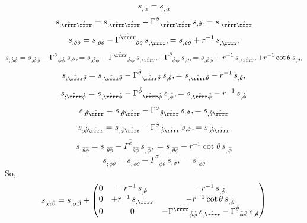 \documentclass[\mydriver,12pt,twoside,notitlepage,a4paper]{article}
\begin{document}
\begin{equation}
s_{;\hat\alpha}=s_{,\hat\alpha}
\end{equation}
\begin{equation}
s_{;\hat\rrrr\hat\rrrr}
=s_{,\hat\rrrr\hat\rrrr}
-{\Gamma^{\hat\sigma}}_{\hat\rrrr\hat\rrrr}\,s_{,\hat\sigma},
=s_{,\hat\rrrr\hat\rrrr}
\end{equation}
\begin{equation}
s_{;\hat\theta\hat\theta}
=s_{,\hat\theta\hat\theta}
-{\Gamma^{\hat\rrrr}}_{\hat\theta\hat\theta}\,s_{,\hat\rrrr},
=s_{,\hat\theta\hat\theta}
+r^{-1}\,s_{,\hat\rrrr},
\end{equation}
\begin{equation}
s_{;\hat\phi\hat\phi}
=s_{,\hat\phi\hat\phi}
-{\Gamma^{\hat\sigma}}_{\hat\phi\hat\phi}\,s_{,\hat\sigma},
=s_{,\hat\phi\hat\phi}
-{\Gamma^{\hat\rrrr}}_{\hat\phi\hat\phi}\,s_{,\hat\rrrr},
-{\Gamma^{\hat\theta}}_{\hat\phi\hat\phi}\,s_{,\hat\theta},
=s_{,\hat\phi\hat\phi}
+r^{-1}\,s_{,\hat\rrrr},
+r^{-1}\cot\theta\,s_{,\hat\theta},
\end{equation}
\begin{equation}
s_{;\hat\rrrr\hat\theta}
=s_{,\hat\rrrr\hat\theta}
-{\Gamma^{\hat\theta}}_{\hat\rrrr\hat\theta}\,s_{,\hat\theta},
=s_{,\hat\rrrr\hat\theta}
-r^{-1}\,s_{,\hat\theta},
\end{equation}
\begin{equation}
s_{;\hat\rrrr\hat\phi}
=s_{,\hat\rrrr\hat\phi}
-{\Gamma^{\hat\phi}}_{\hat\rrrr\hat\phi}\,s_{,\hat\phi},
=s_{,\hat\rrrr\hat\phi}-r^{-1}\,s_{,\hat\phi}
\end{equation}
\begin{equation}
s_{;\hat\theta\hat\rrrr}
=s_{,\hat\theta\hat\rrrr}
-{\Gamma^{\hat\sigma}}_{\hat\theta\hat\rrrr}\,s_{,\hat\sigma},
=s_{,\hat\theta\hat\rrrr}
\end{equation}
\begin{equation}
s_{;\hat\phi\hat\rrrr}
=s_{,\hat\phi\hat\rrrr}
-{\Gamma^{\hat\sigma}}_{\hat\phi\hat\rrrr}\,s_{,\hat\sigma},
=s_{,\hat\phi\hat\rrrr}
\end{equation}
\begin{equation}
s_{;\hat\theta\hat\phi}
=s_{,\hat\theta\hat\phi}
-{\Gamma^{\hat\phi}}_{\hat\theta\hat\phi}\,s_{,\hat\phi},
=s_{,\hat\theta\hat\phi}
-r^{-1}\cot\theta\,s_{,\hat\phi}
\end{equation}
\begin{equation}
s_{;\hat\phi\hat\theta}
=s_{,\hat\phi\hat\theta}
-{\Gamma^{\hat\sigma}}_{\hat\phi\hat\theta}\,s_{,\hat\sigma},
=s_{,\hat\phi\hat\theta}
\end{equation}
So,
\begin{equation}
s_{;\hat\alpha\hat\beta}=s_{,\hat\alpha\hat\beta}+
\begin{pmatrix}
0 & -r^{-1}\,s_{,\hat\theta} & -r^{-1}\,s_{,\hat\phi} \cr
0 & +r^{-1}\,s_{,\hat\rrrr}  & -r^{-1}\cot\theta\,s_{,\hat\phi} \cr
0 & 0 & -{\Gamma^{\hat\rrrr}}_{\hat\phi\hat\phi}\,s_{,\hat\rrrr}
-{\Gamma^{\hat\theta}}_{\hat\phi\hat\phi}\,s_{,\hat\theta}
\end{pmatrix}
\end{equation}
\end{document}
